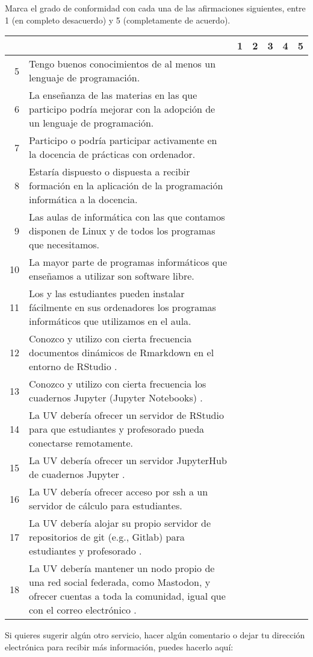 \documentclass[a4paper,12pt]{article}
\begin{document}
Marca el grado de conformidad con cada una de las afirmaciones siguientes, entre 1
(en completo desacuerdo) y 5 (completamente de acuerdo).

{\small
\begin{tabular}{|r|p{9cm}|c|c|c|c|c|}
\toprule
&&1&2&3&4&5\\
\midrule
5&Tengo buenos conocimientos de al menos un lenguaje de programación.&&&&&\\
\midrule
6&La enseñanza de las materias en las que participo podría mejorar con la adopción de un lenguaje de programación.&&&&&\\
\midrule
7&Participo o podría participar activamente en la docencia de prácticas con ordenador.&&&&&\\
\midrule
8&Estaría dispuesto o dispuesta a recibir formación en la aplicación de la programación informática a la docencia.&&&&&\\
\midrule
9&Las aulas de informática con las que contamos disponen de Linux y de todos los programas que necesitamos.&&&&&\\
\midrule
10&La mayor parte de programas informáticos que enseñamos a utilizar son software libre.&&&&&\\
\midrule
11&Los y las estudiantes pueden instalar fácilmente en sus ordenadores los programas informáticos que utilizamos en el aula.&&&&&\\
\midrule
12&Conozco y utilizo con cierta frecuencia documentos dinámicos de Rmarkdown en el entorno de RStudio \cite{RStudio}.&&&&&\\
\midrule
13&Conozco y utilizo con cierta frecuencia los cuadernos Jupyter (Jupyter Notebooks) \cite{Barba2019}.&&&&&\\
\midrule
14&La UV debería ofrecer un servidor de RStudio para que estudiantes y profesorado pueda conectarse remotamente.&&&&&\\
\midrule
15&La UV debería ofrecer un servidor JupyterHub de cuadernos Jupyter \cite{JupyterHub}.&&&&&\\
\midrule
16&La UV debería ofrecer acceso por \textsf{ssh} a un servidor de cálculo para estudiantes.&&&&&\\
\midrule
17&La UV debería alojar su propio servidor de repositorios de \textsf{git} (e.g., Gitlab) para estudiantes y profesorado \cite{Paderborn2023,PereiraBraga2023}.&&&&&\\
\midrule
18&La UV debería mantener un nodo propio de una red social federada, como Mastodon, y ofrecer cuentas a toda la comunidad, igual que con el correo electrónico \cite{Brembs2023,mastodon}.&&&&&\\
\bottomrule
\end{tabular}
}

Si quieres sugerir algún otro servicio, hacer algún comentario o dejar tu dirección electrónica para recibir más información, puedes hacerlo aquí:
\vspace*{3cm}



\end{document}
